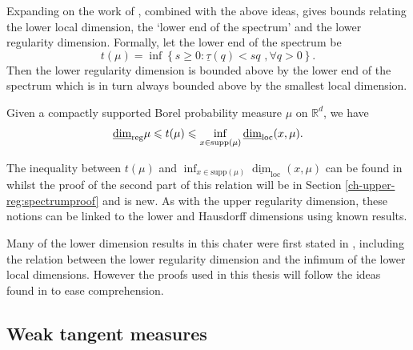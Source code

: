 Expanding on the work of \cite{fraser-jordan}, combined with the above ideas, gives bounds relating the lower local dimension, the `lower end of the spectrum' and the lower regularity dimension. Formally, let the lower end of the spectrum be
\[
t(\mu) = \inf\left\{ s \ge 0 \colon \underline{\tau}(q) < sq  \, \,, \forall q>0 \right\}.
\]
Then the lower regularity dimension is bounded above by the lower end of the spectrum which is in turn always bounded above by the smallest local dimension.

\begin{theorem} \label{ch-upper-reg:lower-relationships}
	Given a compactly supported Borel probability measure $\mu$ on $\mathbb{R}^d$, we have
	\[
    \underline{\dim}_{\textup{reg}} \mu  \leqslant  t(\mu)  \leqslant  \inf_ {x\in \mathrm{supp}(\mu)}  \underline{\dim}_{\mathrm{loc}}(x,\mu).
    \]
\end{theorem}
The inequality between $t(\mu)$ and $\inf_ {x\in \mathrm{supp}(\mu)}  \underline{\dim}_{\mathrm{loc}}(x,\mu)$ can be found in \cite[Lemma 4.4]{olsenformalism} whilst the proof of the second part of this relation will be in Section \ref{ch-upper-reg:spectrumproof} and is new. As with the upper regularity dimension, these notions can be linked to the lower and Hausdorff dimensions using known results. 

Many of the lower dimension results in this chater were first stated in \cite{hare-troscheit}, including the relation between the lower regularity dimension and the infimum of the lower local dimensions. However the proofs used in this thesis will follow the ideas found in \cite{fraser-howroyd2} to ease comprehension.




\subsection{Weak tangent measures}\label{ch-upper-reg:sec:tangent}


